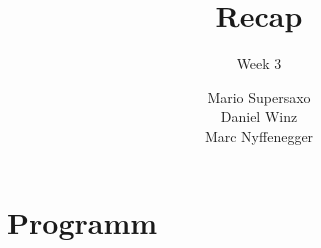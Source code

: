 \documentclass{beamer}
\title{Recap}
\subtitle{Week 3}
\author{Mario Supersaxo \\ Daniel Winz \\ Marc Nyffenegger}
\begin{document}
\maketitle


\section*{Programm}
\begin{frame}
\tableofcontents
\end{frame}





\end{document}
